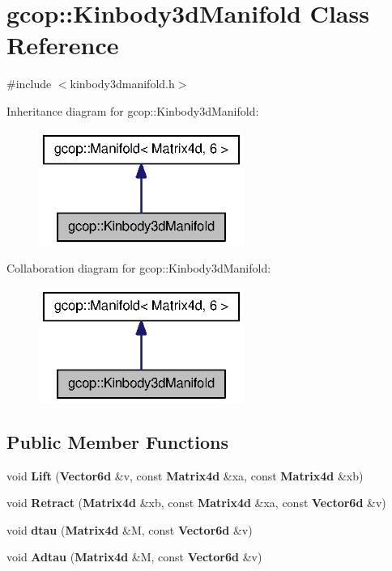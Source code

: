 \section{gcop\-:\-:\-Kinbody3d\-Manifold \-Class \-Reference}
\label{classgcop_1_1Kinbody3dManifold}


{\ttfamily \#include $<$kinbody3dmanifold.\-h$>$}



\-Inheritance diagram for gcop\-:\-:\-Kinbody3d\-Manifold\-:
\nopagebreak
\begin{figure}[H]
\begin{center}
\leavevmode
\includegraphics[width=190pt]{classgcop_1_1Kinbody3dManifold__inherit__graph}
\end{center}
\end{figure}


\-Collaboration diagram for gcop\-:\-:\-Kinbody3d\-Manifold\-:
\nopagebreak
\begin{figure}[H]
\begin{center}
\leavevmode
\includegraphics[width=190pt]{classgcop_1_1Kinbody3dManifold__coll__graph}
\end{center}
\end{figure}
\subsection*{\-Public \-Member \-Functions}
\begin{DoxyCompactItemize}
\item 
void {\bf \-Lift} ({\bf \-Vector6d} \&v, const {\bf \-Matrix4d} \&xa, const {\bf \-Matrix4d} \&xb)
\item 
void {\bf \-Retract} ({\bf \-Matrix4d} \&xb, const {\bf \-Matrix4d} \&xa, const {\bf \-Vector6d} \&v)
\item 
void {\bf dtau} ({\bf \-Matrix4d} \&\-M, const {\bf \-Vector6d} \&v)
\item 
void {\bf \-Adtau} ({\bf \-Matrix4d} \&\-M, const {\bf \-Vector6d} \&v)
\end{DoxyCompactItemize}
